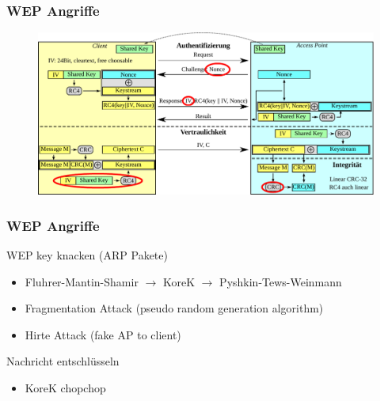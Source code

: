 \documentclass{beamer}
\begin{document}
\begin{frame}
\frametitle{WEP Angriffe}
\begin{figure}
	\includegraphics[width=1.0\linewidth]{figures/WEP_complete_attacks.pdf}
\end{figure}
\end{frame}

\begin{frame}
\frametitle{WEP Angriffe}
\begin{block}{WEP key knacken (ARP Pakete)}
\begin{itemize}
	\item Fluhrer-Mantin-Shamir $\rightarrow$ KoreK $\rightarrow$ Pyshkin-Tews-Weinmann
	\item Fragmentation Attack (pseudo random generation algorithm)
	\item Hirte Attack (fake AP to client)
\end{itemize}
\end{block}
\begin{block}{Nachricht entschlüsseln}
\begin{itemize}
	\item KoreK chopchop
\end{itemize}
\end{block}
\end{frame}
\end{document}
